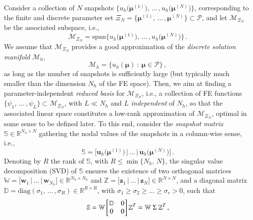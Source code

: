 \documentclass[longtitle]{elsarticle}
\numberwithin{equation}{section}
\theoremstyle{theorem}
\theoremstyle{definition}
\theoremstyle{remark}
\theoremstyle{proposition}
\numberwithin{figure}{section}
\newcommand{\bg}[1]{\boldsymbol{#1}}
\begin{document}
		Consider a collection of $N$ snapshots $\big\lbrace u_h \big( \bg{\mu}^{(1)} \big), \, \ldots \, , u_h \big( \bg{\mu}^{(N)} \big) \big\rbrace$, corresponding to the finite and discrete parameter set $\Xi_N = \big\lbrace \bg{\mu}^{(1)}, \, \ldots \, , \bg{\mu}^{(N)} \big\rbrace \subset \mathcal{P}$, and let $\mathcal{M}_{\Xi_N}$ be the associated subspace, i.e., \[ \mathcal{M}_{\Xi_N} = \text{span} \big\lbrace u_h \big( \bg{\mu}^{(1)} \big), \, \ldots \, , u_h \big( \bg{\mu}^{(N)} \big) \big\rbrace \, . \] We assume that $\mathcal{M}_{\Xi_N}$ provides a good approximation of the \emph{discrete solution manifold} $\mathcal{M}_h$, \[ \mathcal{M}_h = \big\lbrace u_h(\bg{\mu}) ~ : ~ \bg{\mu} \in \mathcal{P} \big\rbrace \, , \] as long as the number of snapshots is sufficiently large (but typically much smaller than the dimension ${N_h}$ of the FE space). Then, we aim at finding a parameter-independent \emph{reduced basis} for $\mathcal{M}_{\Xi_N}$, i.e., a collection of FE functions $\big\lbrace \psi_1, \, \ldots \, , \psi_L \big\rbrace \subset \mathcal{M}_{\Xi_N}$, with $L \ll {N_h}$ and $L$ \emph{independent} of $N_h$, so that the associated linear space constitutes a low-rank approximation of $\mathcal{M}_{\Xi_N}$, optimal in some sense to be defined later. To this end, consider the \emph{snapshot matrix} $\mathbb{S} \in \mathbb{R}^{{N_h} \times N}$ gathering the nodal values of the snapshots in a column-wise sense, i.e.,
		\begin{equation*}
			\mathbb{S} = \big[ \mathbf{u}_h \big( \bg{\mu}^{(1)} \big) \, \big| \, \ldots \, \big| \, \mathbf{u}_h \big( \bg{\mu}^{(N)} \big) \big] \, .
		\end{equation*}
		Denoting by $R$ the rank of $\mathbb{S}$, with $R \leq \min \big\lbrace{ {N_h}, \, N \big\rbrace}$, the singular value decomposition (SVD) of $\mathbb{S}$ ensures the existence of two orthogonal matrices $\mathbb{W} = \big[ \mathbf{w}_1 \, \big| \, \ldots \, \big| \, \mathbf{w}_{N_h} \big] \in \mathbb{R}^{{N_h} \times {N_h}}$ and $\mathbb{Z} = \big[ \mathbf{z}_1 \, \big| \, \ldots \, \big| \, \mathbf{z}_N \big] \in \mathbb{R}^{N \times N}$, and a diagonal matrix $\mathbb{D} = \text{diag}(\sigma_1, \, \ldots \, , \sigma_R) \in \mathbb{R}^{R \times R}$, with $\sigma_1 \geq \sigma_2 \geq \ldots \geq \sigma_r > 0$, such that
		\begin{equation*}
			\label{eq:svd}
			\mathbb{S} = \mathbb{W} 
			\begin{bmatrix}
			\hspace*{-0.15cm}
			\begin{array}{cc}
				\mathbb{D} & 0 \\
				0 & 0
			\end{array} 
			\hspace*{-0.15cm}
			\end{bmatrix}
			\mathbb{Z}^T = \mathbb{W} ~ \Sigma ~ \mathbb{Z}^T \, ,
		\end{equation*}
\end{document}

